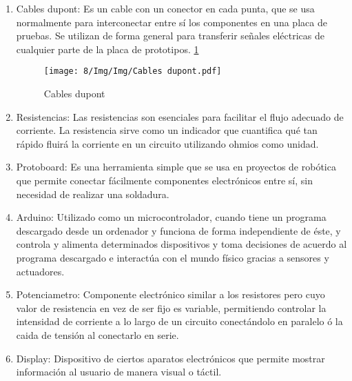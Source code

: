 \begin{enumerate}
    \item Cables dupont: Es un cable con un conector en cada punta, que se usa normalmente para interconectar entre sí los componentes en una placa de pruebas. Se utilizan de forma general para transferir señales eléctricas de cualquier parte de la placa de prototipos.
    \ref{Cables}
\begin{figure}
    \centering
    \texttt{[image: 8/Img/Img/Cables dupont.pdf]}
    \caption{Cables dupont}
    \label{Cables}
\end{figure}
    \item Resistencias: Las resistencias son esenciales para facilitar el flujo adecuado de corriente. La resistencia sirve como un indicador que cuantifica qué tan rápido fluirá la corriente en un circuito utilizando ohmios como unidad.
    \item Protoboard: Es una herramienta simple que se usa en proyectos de robótica que permite conectar fácilmente componentes electrónicos entre sí, sin necesidad de realizar una soldadura.
    \item Arduino: Utilizado como un microcontrolador, cuando tiene un programa descargado desde un ordenador y funciona de forma independiente de éste, y controla y alimenta determinados dispositivos y toma decisiones de acuerdo al programa descargado e interactúa con el mundo físico gracias a sensores y actuadores.
    \item Potenciametro: Componente electrónico similar a los resistores pero cuyo valor de resistencia en vez de ser fijo es variable, permitiendo controlar la intensidad de corriente a lo largo de un circuito conectándolo en paralelo ó la caida de tensión al conectarlo en serie.
    \item Display: Dispositivo de ciertos aparatos electrónicos que permite mostrar información al usuario de manera visual o táctil.
\end{enumerate}

